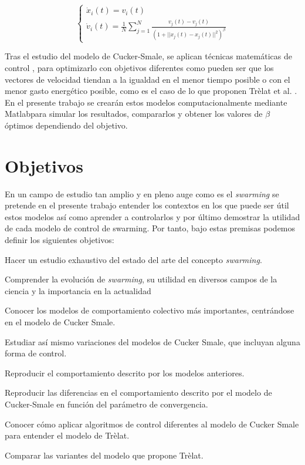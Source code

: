 \begin{equation}\label{eq:generalCSbeta} 
    \left\lbrace
    \begin{array}{ll}
        \dot{x}_{i}(t)=v_{i}(t) \\
        \dot{v}_{i}(t)= \displaystyle{\frac{1}{N}\sum_{j=1}^{N}\frac{v_{j}(t)-v_{j}(t)}{(1+||x_{j}(t)-x_{j}(t)||^2)^\beta}}
    \end{array}
    \right.
\end{equation}

Tras el estudio del modelo de Cucker-Smale, se aplican técnicas matemáticas de control \cite{canizo2010collective}, \cite{caponigro2015sparse} para optimizarlo con objetivos diferentes como pueden ser que los vectores de velocidad tiendan a la igualdad en el menor tiempo posible o con el menor gasto energético posible, como es el caso de lo que proponen Trèlat et al. \cite{caponigro2015sparse}. En el presente trabajo se crearán estos modelos computacionalmente mediante Matlab\textregistered\space para simular los resultados, compararlos y obtener los valores de $\beta$ óptimos dependiendo del objetivo.

\section{Objetivos}\label{s1_3}
En un campo de estudio tan amplio y en pleno auge como es el \textit{swarming} se pretende en el presente trabajo entender los contextos en los que puede ser útil estos modelos así como aprender a controlarlos y por último demostrar la utilidad de cada modelo de control de swarming. Por tanto, bajo estas premisas podemos definir los siguientes objetivos:

\begin{objetivos}
    \item Hacer un estudio exhaustivo del estado del arte del concepto \textit{swarming}.
    \item Comprender la evolución de \textit{swarming}, su utilidad en diversos campos de la ciencia y la importancia en la actualidad
    \item Conocer los modelos de comportamiento colectivo más importantes, centrándose en el modelo de Cucker Smale.
    \item Estudiar así mismo variaciones del modelos de Cucker Smale, que incluyan alguna forma de control.
    \item Reproducir el comportamiento descrito por los modelos anteriores.
    \item Reproducir las diferencias en el comportamiento descrito por el modelo de Cucker-Smale en función del parámetro de convergencia.
    \item Conocer cómo aplicar algoritmos de control diferentes al modelo de Cucker Smale para entender el modelo de Trèlat. 
    \item Comparar las variantes del modelo que propone Trèlat.
\end{objetivos}


